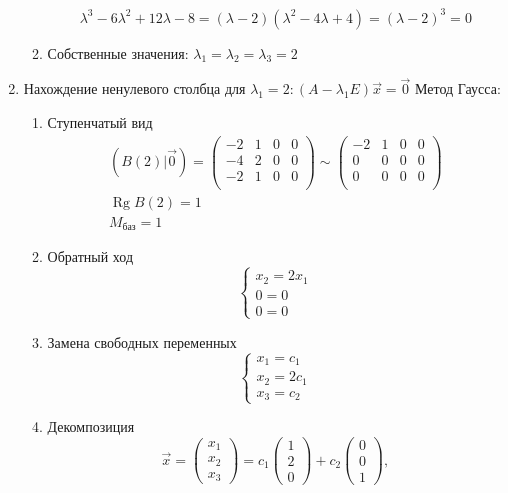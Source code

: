 \documentclass{article}
\DeclareMathOperator*{\Rg}{Rg}
\begin{document}
\begin{enumerate}
\begin{enumerate}
		\[
			\lambda^3 - 6\lambda^2 + 12\lambda - 8 = (\lambda - 2)(\lambda^2 - 4\lambda + 4) = (\lambda - 2)^3 = 0
		\]
		\item Собственные значения: $\lambda_1 = \lambda_2 = \lambda_3 = 2$
	\end{enumerate}
	\item Нахождение ненулевого столбца для $\lambda_1 = 2 : (A - \lambda_1 E)\vec{x} = \vec{0}$
	Метод Гаусса: \begin{enumerate}
		\item Ступенчатый вид
		\begin{gather*}
			(B(2) | \vec{0}) = \begin{pmatrix}
				-2 & 1 & 0 & 0 \\
				-4 & 2 & 0 & 0 \\
				-2 & 1 & 0 & 0 \\
			\end{pmatrix} \sim \begin{pmatrix}
				-2 & 1 & 0 & 0 \\
				0 & 0 & 0 & 0 \\
				0 & 0 & 0 & 0 \\
			\end{pmatrix} \\
			\Rg B(2) = 1 \\
			M_{\text{баз}} = 1
		\end{gather*}
		\item Обратный ход
		\[
			\begin{cases}
				x_2 = 2x_1 \\
				0 = 0 \\
				0 = 0
			\end{cases}
		\]
		\item Замена свободных переменных
		\[	
			\begin{cases}
				x_1 = c_1 \\
				x_2 = 2c_1 \\
				x_3 = c_2
			\end{cases}
		\]
		\item Декомпозиция
		\[
			\vec{x} = \begin{pmatrix} x_1 \\ x_2 \\ x_3 \end{pmatrix} =
			c_1 \begin{pmatrix} 1 \\ 2 \\ 0 \end{pmatrix} +
			c_2 \begin{pmatrix} 0 \\ 0 \\ 1 \end{pmatrix},
\]
\end{enumerate}
\end{enumerate}
\end{document}
